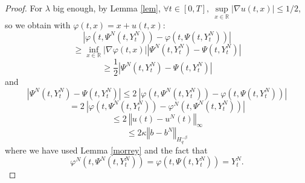 \documentclass[11pt]{enstaPRE}
\newcommand{\norme}[1]{\left\Vert #1\right\Vert}
\newcommand{\R}{\mathbb{R}}
\begin{document}
\begin{proof}
    For $\lambda$ big enough, by Lemma \ref{lem}, $\forall t \in[0,T],\ \underset{x\in\R}{\sup}\left|\nabla u(t,x)\right| \leq 1/2$, so we obtain with $\varphi(t,x)=x+u(t,x)$:
    \begin{equation*}
    \left|\varphi\left(t,\Psi^N\left(t,Y_t^N\right)\right)-\varphi\left(t,\Psi\left(t,Y_t^N\right)\right)\right| 
    \end{equation*}
    \begin{equation*}
    \geq \underset{x\in\R}{\inf}\left|\nabla\varphi(t,x)\right|
    \left|\Psi^N\left(t,Y_t^N\right)-\Psi\left(t,Y_t^N\right)\right|
    \end{equation*}
    \begin{equation*}
    \geq \frac{1}{2} \left|\Psi^N\left(t,Y_t^N\right)-\Psi\left(t,Y_t^N\right)\right|
    \end{equation*}    
    and 
    \begin{equation*}
    \left|\Psi^N\left(t,Y_t^N\right)-\Psi\left(t,Y_t^N\right)\right|\leq 2\ \left|\varphi\left(t,\Psi^N\left(t,Y_t^N\right)\right)-\varphi\left(t,\Psi\left(t,Y_t^N\right)\right)\right|
    \end{equation*}   
    \begin{equation*}
    = 2\ \left|\varphi\left(t,\Psi^N\left(t,Y_t^N\right)\right)-\varphi^N\left(t,\Psi^N\left(t,Y_t^N\right)\right)\right|
    \end{equation*}   
    \begin{equation*}
    \leq 2\ \norme{u(t)-u^N(t)}_\infty
    \end{equation*} 
    \begin{equation}\label{other}
    \leq 2\kappa \norme{b-b^N}_{H^{-\beta}_q}
    \end{equation} 
    where we have used Lemma \ref{morrey} and the fact that \begin{equation*}
    \varphi^N\left(t,\Psi^N\left(t,Y_t^N\right)\right)=\varphi\left(t,\Psi\left(t,Y_t^N\right)\right) = Y_t^N.
    \end{equation*}
\end{proof}
\end{document}
